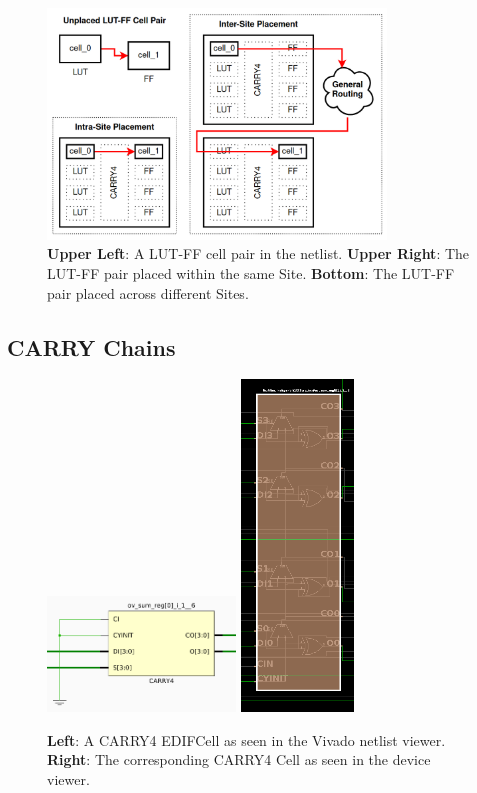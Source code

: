 \documentclass[twocolumn]{article}
\begin{document}
            \begin{figure}[H]
                \centering
                \includegraphics[width=9.0cm]{figures/intersite_intrasite_2.png}
                \caption{
                    \textbf{Upper Left}: A LUT-FF cell pair in the netlist.
                    \textbf{Upper Right}: The LUT-FF pair placed within the same Site.
                    \textbf{Bottom}: The LUT-FF pair placed across different Sites.
                }
            \end{figure}



        \subsection{CARRY Chains}
            \begin{figure}[]
                \centering
                \includegraphics[width=5.0cm]{figures/carry_cell_edif.png}
                \includegraphics[width=3.0cm]{figures/carry_cell_device.png}
                \caption{
                    \textbf{Left}: A CARRY4 EDIFCell as seen in the Vivado netlist viewer.
                    \textbf{Right}: The corresponding CARRY4 Cell as seen in the device viewer.
                }
            \end{figure}
\end{document}
